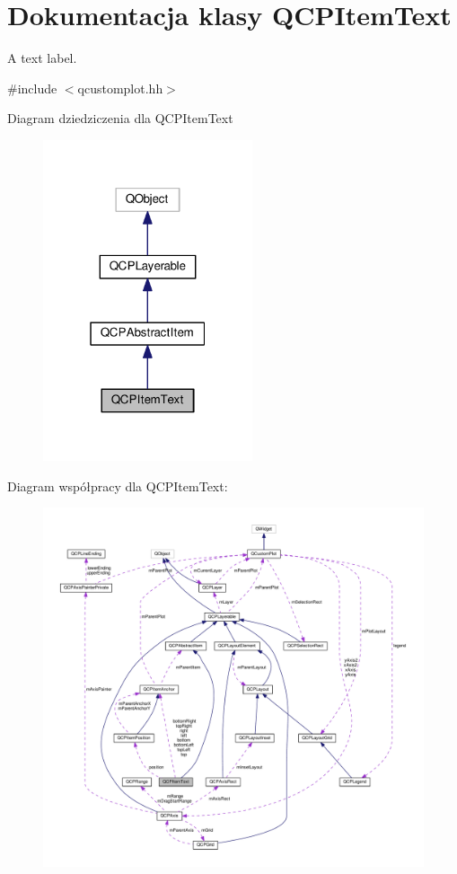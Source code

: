\hypertarget{class_q_c_p_item_text}{}\section{Dokumentacja klasy Q\+C\+P\+Item\+Text}
\label{class_q_c_p_item_text}


A text label.  




{\ttfamily \#include $<$qcustomplot.\+hh$>$}



Diagram dziedziczenia dla Q\+C\+P\+Item\+Text\nopagebreak
\begin{figure}[H]
\begin{center}
\leavevmode
\includegraphics[width=175pt]{class_q_c_p_item_text__inherit__graph}
\end{center}
\end{figure}


Diagram współpracy dla Q\+C\+P\+Item\+Text\+:\nopagebreak
\begin{figure}[H]
\begin{center}
\leavevmode
\includegraphics[width=350pt]{class_q_c_p_item_text__coll__graph}
\end{center}
\end{figure}
